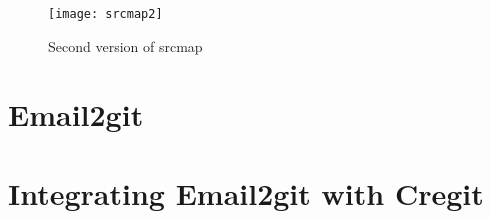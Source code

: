 \begin{figure}[htb]
\centering
\texttt{[image: srcmap2]}
\caption{Second version of srcmap}
\label{fig:srcmap2}
\end{figure}

\section{Email2git}


\section{Integrating Email2git with Cregit}




